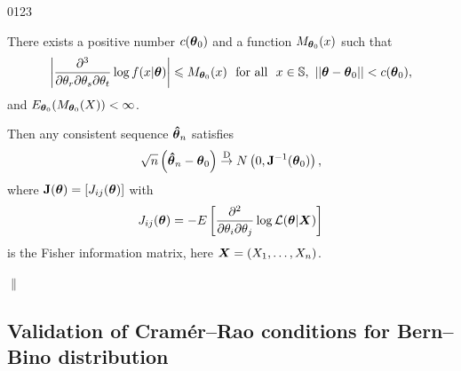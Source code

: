 \begin{theorem}
{\begin{namelist}{0123}
                \item[\hspace*{-0.05cm} (A7)]   There exists a positive number $c({\boldsymbol{\theta}}_0)$ and a function $M_{{\boldsymbol{\theta}}_0}(x)$ such that
                \begin{eqnarray}
                    \bigg|\frac{\pa^3}{\pa\theta_r \pa\theta_s \pa\theta_t}\log f(x|\bth)\bigg| \le M_{\bth_0}(x) \ \mbox{ for all } \ x\in\bbS, \ ||\bth-\bth_0|| < c(\bth_0), \nonumber
                \end{eqnarray}
                and $E_{{\boldsymbol{\theta}}_0}(M_{{\boldsymbol{\theta}}_0}(X)) < \infty$.
    \end{namelist}
    Then any consistent sequence $\boldsymbol{\hat{\theta}}_n$ satisfies
    \begin{eqnarray}
        \sqrt{n}\left(\boldsymbol{\hat{\theta}}_n-{\boldsymbol{\theta}}_0\right) \overset{\text{D}}{\rightarrow} N \left(0, {\bf J}^{-1}({\boldsymbol{\theta}}_0)\right), \nonumber
    \end{eqnarray}
     where ${\bf J}({\boldsymbol{\theta}})=[J_{ij}({\boldsymbol{\theta}})]$ with
    \begin{eqnarray}
        J_{ij}({\boldsymbol{\theta}}) = -E\left[\frac{\partial^2}{\partial\theta_i\partial\theta_j} \log \mathcal{L}({\boldsymbol{\theta}}|{\boldsymbol{X}})\right] \nonumber
    \end{eqnarray}
    is the Fisher information matrix, here ${\boldsymbol{X}} = (X_1, \ldots, X_n)$.
    }  \hfill $\|$
\end{theorem}

\subsection{Validation of Cram\'er--Rao conditions for Bern--Bino distribution}        %


